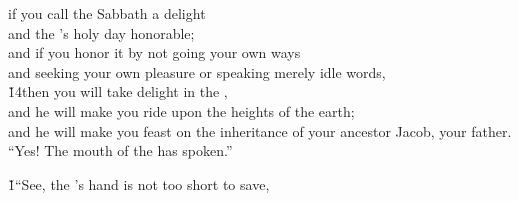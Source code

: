 \begin{poetry}
\poeml if you call the Sabbath a delight \\
\poemll    and the 's holy day honorable; \\
\poeml and if you honor it by not going your own ways \\
\poemll    and seeking your own pleasure or speaking merely idle words, \\
\poeml \v{14}then you will take delight in the , \\
\poemll    and he will make you ride upon the heights of the earth; \\
\poeml and he will make you feast on the inheritance of your ancestor Jacob, your father. \\
\poeml ``Yes! The mouth of the  has spoken.''
\end{poetry}

\v{1}``See, the 's hand is not too short to save,


